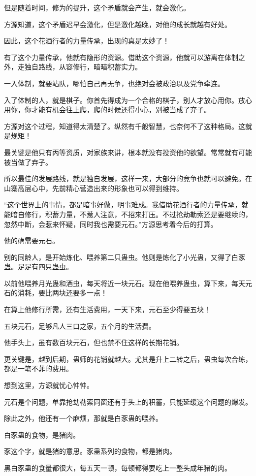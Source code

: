 \begin{this_body}
但是随着时间，修为的提升，这个矛盾就会产生，就会激化。

方源知道，这个矛盾迟早会激化，但是激化越晚，对他的成长就越有好处。

因此，这个花酒行者的力量传承，出现的真是太妙了！

有了这个力量传承，他就有隐形的资源。借助这个资源，他就可以游离在体制之外，走独自路线，从容修行，暗暗积蓄实力。

一入体制，就要站队，哪怕自己再无争，也绝对会被政治以及党争牵连。

入了体制的人，就是棋子。你首先得成为一个合格的棋子，别人才放心用你。放心用你，你才能有机会往上爬，爬的时候还得小心，别被当成了弃子。

方源对这个过程，知道得太清楚了。纵然有千般智慧，也奈何不了这种格局。这就是规矩！

最关键是他只有丙等资质，对家族来讲，根本就没有投资他的欲望。常常就有可能被当做了弃子。

所以最佳的发展路线，就是独自发展，这样一来，大部分的竞争也就可以避免。在山寨高层心中，先前精心营造出来的形象也可以得到维持。

“这个世界上的事情，都是暗事好做，明事难成。我借助花酒行者的力量传承，就能暗自修行，积蓄力量，不惹人注意，不招来打压。不过抢劫勒索还是要继续的，忽然中断，会惹来怀疑，同时我也需要元石。”方源思考着今后的打算。

他的确需要元石。

别的同龄人，是开始炼化、喂养第二只蛊虫。他则是炼化了小光蛊，又得了白豕蛊。足足有四只蛊虫。

以前他喂养月光蛊和酒虫，每天将近一块元石。现在他喂养蛊虫，算下来，每天元石的消耗，要比两块还要多一点！

在算上他修行所需，还有生活费用，一天下来，元石至少得要五块！

五块元石，足够凡人三口之家，五个月的生活费。

他手头上，虽有数百块元石，但也禁不住这样的长期花销。

更关键是，越到后期，蛊师的花销就越大。尤其是升上二转之后，蛊虫每次合练，都是一笔不菲的费用。

想到这里，方源就忧心忡忡。

元石是个问题，单靠抢劫勒索同窗还有手头上的积蓄，只能延缓这个问题的爆发。

除此之外，他还有一个麻烦，那就是白豕蛊的喂养。

白豕蛊的食物，是猪肉。

豕这个字，就是猪的意思。豕蛊系列的食物，都是猪肉。

黑白豕蛊的食量都很大，每五天一顿，每顿都得要吃上一整头成年猪的肉。


\end{this_body}

